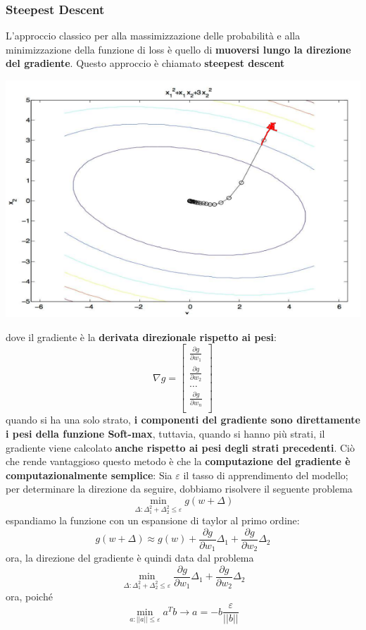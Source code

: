 \documentclass[12pt]{article}
\begin{document}
\subsubsection{Steepest Descent}
L'approccio classico per alla massimizzazione delle probabilità e alla minimizzazione della funzione di loss è quello di \textbf{muoversi lungo la direzione del gradiente}.
Questo approccio è chiamato \textbf{steepest descent}
\begin{center}
    \includegraphics[width =0.60\linewidth]{Images/117.PNG}
\end{center}
dove il gradiente è la \textbf{derivata direzionale rispetto ai pesi}:
$$\nabla g = \begin{bmatrix}
    \frac{\partial g}{\partial w_1} \\
    \frac{\partial g}{\partial w_2} \\
    \dots \\
    \frac{\partial g}{\partial w_n} \\
\end{bmatrix}$$
quando si ha una solo strato, \textbf{i componenti del gradiente sono direttamente i pesi della funzione Soft-max}, tuttavia, quando si hanno più strati, il gradiente viene calcolato \textbf{anche rispetto ai pesi degli strati precedenti}.
Ciò che rende vantaggioso questo metodo è che la \textbf{computazione del gradiente è computazionalmente semplice}: Sia $\varepsilon$ il tasso di apprendimento del modello; per determinare la direzione da seguire, dobbiamo risolvere il seguente problema
$$\min_{\Delta: \Delta_1^2 + \Delta_2^2 \leq \varepsilon} g(w+ \Delta)$$
espandiamo la funzione con un espansione di taylor al primo ordine:
$$g(w + \Delta) \approx g(w) + \frac{\partial g}{ \partial w_1} \Delta_1 + \frac{\partial g}{\partial w_2} \Delta_2$$
ora, la direzione del gradiente è quindi data dal problema
$$\min_{\Delta: \Delta_1^2 + \Delta_2^2 \leq \varepsilon} \frac{\partial g}{ \partial w_1} \Delta_1 + \frac{\partial g}{\partial w_2} \Delta_2$$
ora, poiché
$$\min_{a: ||a|| \leq \varepsilon} a^T b \rightarrow a = -b \frac{\varepsilon}{||b||}$$
\end{document}
